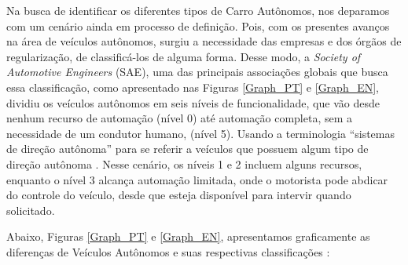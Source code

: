 Na busca de identificar os diferentes tipos de Carro Autônomos, nos deparamos com um cenário ainda em processo de definição. Pois, com os presentes avanços na área de veículos autônomos, surgiu a necessidade das empresas e dos órgãos de regularização, de classificá-los de alguma forma. Desse modo, a \textit{Society of Automotive Engineers} (SAE), uma das principais associações globais que busca essa classificação, como apresentado nas Figuras \ref{Graph_PT} e \ref{Graph_EN}, dividiu os veículos autônomos em seis níveis de funcionalidade, que vão desde nenhum recurso de automação (nível 0) até automação completa, sem a necessidade de um condutor humano, (nível 5). Usando a terminologia “sistemas de direção autônoma” para se referir a veículos que possuem algum tipo de direção autônoma \cite{SAE}. Nesse cenário, os níveis 1 e 2 incluem alguns recursos, enquanto o nível 3 alcança automação limitada, onde o motorista pode abdicar do controle do veículo, desde que esteja disponível para intervir quando solicitado.

Abaixo, Figuras \ref{Graph_PT} e \ref{Graph_EN}, apresentamos graficamente as diferenças de Veículos Autônomos e suas respectivas classificações \cite{SAE}:

